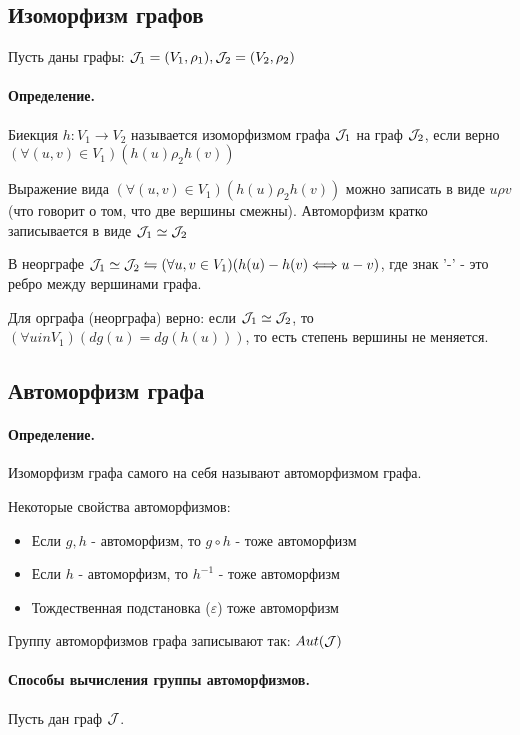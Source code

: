 \documentclass{report}
\begin{document}
\subsection{Изоморфизм графов}
Пусть даны графы: $ {\cal J}_{1} = (V_1, \rho_{1}), {\cal J}_{2} = (V_2, \rho_2)$

\paragraph*{Определение.}
Биекция $h: V_1 \to V_2$ называется изоморфизмом графа $ {\cal J}_{1}$ на
граф $ {\cal J}_{2}$, если верно $(\forall (u,v) \in V_1)(h(u)\rho_2h(v))$

Выражение вида $(\forall (u,v) \in V_1)(h(u)\rho_2h(v))$ можно записать в виде
$u\rho v$ (что говорит о том, что две вершины смежны). Автоморфизм кратко
записывается в виде 
$
{\cal J}_{1} \simeq {\cal J}_{2}
$
\medskip

В неорграфе $ {\cal J}_{1} \simeq {\cal J}_{2} \leftrightharpoons
(\forall u,v \in V_1)(h(u)-h(v) \Longleftrightarrow u-v)$, где знак '-' - это ребро между
вершинами графа.

\medskip

Для орграфа (неорграфа) верно: если $ {\cal J}_{1} \simeq {\cal J}_{2}$, то
$(\forall u in V_1)(dg(u) = dg(h(u)))$, то есть степень вершины не меняется.

\subsection{Автоморфизм графа}
\paragraph*{Определение.}
Изоморфизм графа самого на себя называют автоморфизмом графа.

\medskip

Некоторые свойства автоморфизмов:
\begin{itemize}
	\item Если $g, h$ - автоморфизм, то  $g \circ h$ - тоже автоморфизм
	\item Если  $h$ - автоморфизм, то  $h^{-1}$ - тоже автоморфизм
	\item Тождественная подстановка ($\varepsilon$) тоже автоморфизм
\end{itemize}


\medskip

Группу автоморфизмов графа записывают так: $Aut( {\cal J} )$

\paragraph*{Способы вычисления группы автоморфизмов.}
Пусть дан граф $ {\cal J}$.
\end{document}
